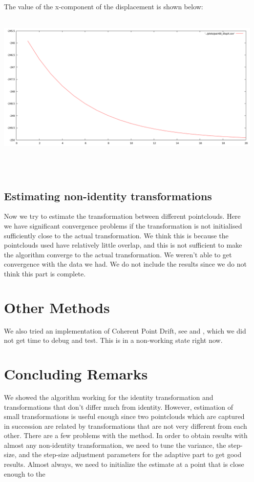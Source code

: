 \documentclass[11pt, a4paper]{article}
\begin{document}
The value of the x-component of the displacement is shown below: \\ \\
\centerline{\includegraphics[scale=0.35]{pair00_dispX}} \\ \\

\subsection{Estimating non-identity transformations}
Now we try to estimate the transformation between different pointclouds. Here we have significant convergence problems if the transformation is not initialised sufficiently close to the actual transformation. We think this is because the pointclouds used have relatively little overlap, and this is not sufficient to make the algorithm converge to the actual transformation. We weren't able to get convergence with the data we had. We do not include the results since we do not think this part is complete.

\section{Other Methods}
We also tried an implementation of Coherent Point Drift, see \cite{cpd} and \cite{wiki}, which we did not get time to debug and test. This is in a non-working state right now.

\section{Concluding Remarks}
We showed the algorithm working for the identity transformation and transformations that don't differ much from identity. However, estimation of small transformations is useful enough since two pointclouds which are captured in succession are related by transformations that are not very different from each other.
\newline \linebreak
\noindent There are a few problems with the method. In order to obtain results with almost any non-identity transformation, we need to tune the variance, the step-size, and the step-size adjustment parameters for the adaptive part to get good results. Almost always, we need to initialize the estimate at a point that is close enough to the 
\end{document}
